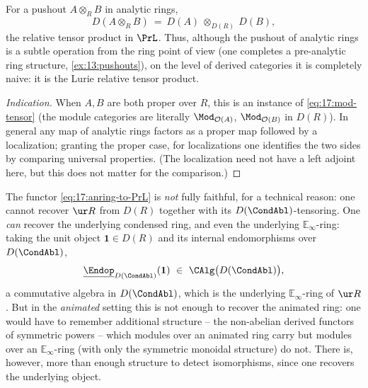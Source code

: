 \begin{corollary}
\label{cor:17:pushout-tensor}
For a pushout $A\otimes_{R}B$ in analytic rings,
\begin{equation*}
D(A\otimes_{R}B)\ =\ D(A)\ \otimes_{D(R)}\ D(B),
\end{equation*}
the relative tensor product in $\PrL$. Thus, although the pushout of analytic rings is a
subtle operation from the ring point of view (one completes a pre-analytic ring structure,
\cref{ex:13:pushouts}), on the level of derived categories it is completely naive: it is the
Lurie relative tensor product.
\end{corollary}

\begin{proof}[Indication]
When $A,B$ are both proper over $R$, this is an instance of \eqref{eq:17:mod-tensor}
(the module categories are literally $\Mod_{\mathcal O(A)}$, $\Mod_{\mathcal O(B)}$ in
$D(R)$). In general any map of analytic rings factors as a proper map followed by a
localization; granting the proper case, for localizations one identifies the two sides by
comparing universal properties. (The localization need not have a left adjoint here, but this
does not matter for the comparison.)
\end{proof}

\begin{remark}
\label{rmk:17:not-ff}
The functor \eqref{eq:17:anring-to-PrL} is \emph{not} fully faithful, for a technical
reason: one cannot recover $\ur R$ from $D(R)$ together with its $D(\CondAbl)$-tensoring.
One \emph{can} recover the underlying condensed ring, and even the underlying
$\mathbb{E}_\infty$-ring: taking the unit object $\mathbf 1\in D(R)$ and its internal
endomorphisms over $D(\CondAbl)$,
\begin{equation*}
\underline{\Endop}_{D(\CondAbl)}(\mathbf 1)\ \in\ \CAlg\bigl(D(\CondAbl)\bigr),
\end{equation*}
a commutative algebra in $D(\CondAbl)$, which is the underlying $\mathbb{E}_\infty$-ring of
$\ur R$. But in the
\emph{animated} setting this is not enough to recover the animated ring: one would have to
remember additional structure -- the non-abelian derived functors of symmetric powers -- which
modules over an animated ring carry but modules over an $\mathbb{E}_\infty$-ring (with only the
symmetric monoidal structure) do not. There is, however, more than enough structure to
detect isomorphisms, since one recovers the underlying object.
\end{remark}

